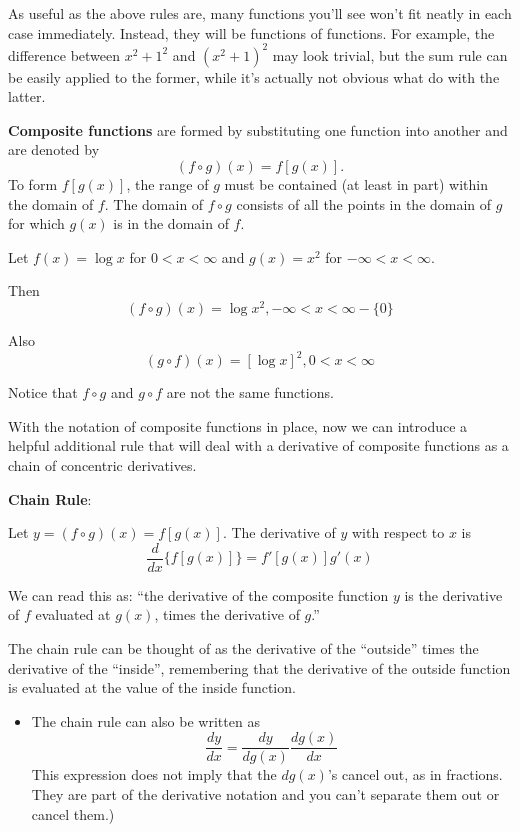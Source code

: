 \documentclass[]{book}
\providecommand{\tightlist}{%
  \setlength{\itemsep}{0pt}\setlength{\parskip}{0pt}}
\theoremstyle{definition}
\theoremstyle{definition}
\theoremstyle{definition}
\theoremstyle{remark}
\let\BeginKnitrBlock\begin \let\EndKnitrBlock\end
\begin{document}
As useful as the above rules are, many functions you'll see won't fit neatly in each case immediately. Instead, they will be functions of functions. For example, the difference between \(x^2 + 1^2\) and \((x^2 + 1)^2\) may look trivial, but the sum rule can be easily applied to the former, while it's actually not obvious what do with the latter.

\textbf{Composite functions} are formed by substituting one function into another and are denoted by \[(f\circ g)(x)=f[g(x)].\] To form \(f[g(x)]\), the range of \(g\) must be contained (at least in part) within the domain of \(f\). The domain of \(f\circ g\) consists of all the points in the domain of \(g\) for which \(g(x)\) is in the domain of \(f\).

\BeginKnitrBlock{example}
\protect\hypertarget{exm:unnamed-chunk-17}{}{\label{exm:unnamed-chunk-17} }Let \(f(x)=\log x\) for \(0<x<\infty\) and \(g(x)=x^2\) for \(-\infty<x<\infty\).

Then
\[(f\circ g)(x)=\log x^2, -\infty<x<\infty - \{0\}\]

Also
\[(g\circ f)(x)=[\log x]^2, 0<x<\infty\]

Notice that \(f\circ g\) and \(g\circ f\) are not the same functions.
\EndKnitrBlock{example}

With the notation of composite functions in place, now we can introduce a helpful additional rule that will deal with a derivative of composite functions as a chain of concentric derivatives.

\textbf{Chain Rule}:

Let \(y=(f\circ g)(x)= f[g(x)]\). The derivative of \(y\) with respect to \(x\) is \[\frac{d}{dx} \{ f[g(x)] \} = f'[g(x)] g'(x)\]

We can read this as: ``the derivative of the composite function \(y\) is the derivative of \(f\) evaluated at \(g(x)\), times the derivative of \(g\).''

The chain rule can be thought of as the derivative of the ``outside'' times the derivative of the ``inside'', remembering that the derivative of the outside function is evaluated at the value of the inside function.

\begin{itemize}
\tightlist
\item
  The chain rule can also be written as \[\frac{dy}{dx}=\frac{dy}{dg(x)} \frac{dg(x)}{dx}\] This expression does not imply that the \(dg(x)\)'s cancel out, as in fractions. They are part of the derivative notation and you can't separate them out or cancel them.)
\end{itemize}
\end{document}
